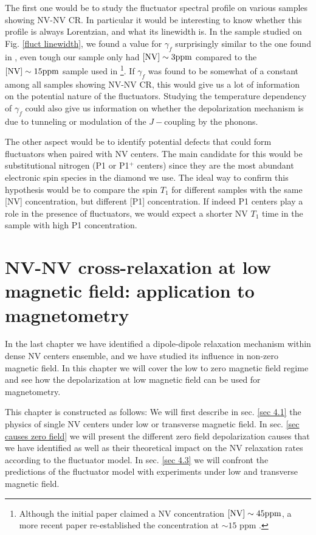 \documentclass[a4paper, 11pt]{report}
\begin{document}
The first one would be to study the fluctuator spectral profile on various samples showing NV-NV CR. In particular it would be interesting to know whether this profile is always Lorentzian, and what its linewidth is. In the sample studied on Fig. \ref{fluct linewidth}, we found a value for $\gamma_f$ surprisingly similar to the one found in \citep{choi2017depolarization}, even tough our sample only had $[\rm NV] \sim 3 ppm$ compared to the $[\rm NV] \sim 15 ppm$ sample used in \citep{choi2017depolarization} \footnote{Although the initial paper claimed a NV concentration $[\rm NV] \sim 45 ppm$, a more recent paper re-established the concentration at $\sim 15$ ppm \citep{zhou2020quantum}.}. If $\gamma_f$ was found to be somewhat of a constant among all samples showing NV-NV CR, this would give us a lot of information on the potential nature of the fluctuators. Studying the temperature dependency of $\gamma_f$ could also give us information on whether the depolarization mechanism is due to tunneling or modulation of the $J-$coupling by the phonons.

The other aspect would be to identify potential defects that could form fluctuators when paired with NV centers. The main candidate for this would be substitutional nitrogen (P1 or P1$^+$ centers) since they are the most abundant electronic spin species in the diamond we use. The ideal way to confirm this hypothesis would be to compare the spin $T_1$ for different samples with the same [NV] concentration, but different [P1] concentration. If indeed P1 centers play a role in the presence of fluctuators, we would expect a shorter NV $T_1$ time in the sample with high P1 concentration.



\chapter{NV-NV cross-relaxation at low magnetic field: application to magnetometry}

In the last chapter we have identified a dipole-dipole relaxation mechanism within dense NV centers ensemble, and we have studied its influence in non-zero magnetic field. In this chapter we will cover the low to zero magnetic field regime and see how the depolarization at low magnetic field can be used for magnetometry.

This chapter is constructed as follows: We will first describe in sec. \ref{sec 4.1} the physics of single NV centers under low or transverse magnetic field. In sec. \ref{sec causes zero field}
we will present the different zero field depolarization causes that we have identified as well as their theoretical impact on the NV relaxation rates according to the fluctuator model. In sec. \ref{sec 4.3} we will confront the predictions of the fluctuator model with experiments under low and transverse magnetic field. 
\end{document}
